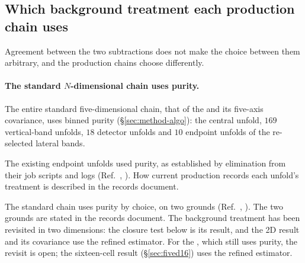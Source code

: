 \subsection{Which background treatment each production chain uses}
\label{sec:negweight-footing}

Agreement between the two subtractions does not make the choice between them arbitrary, and the production chains choose differently.

\paragraph{The standard \(N\)-dimensional chain uses purity.} The entire standard five-dimensional chain, that of the \resFiveAxis{} and its five-axis covariance, uses binned purity (\S\ref{sec:method-algo}): the central unfold, $169$ vertical-band unfolds, $18$ detector unfolds and $10$ endpoint unfolds of the re-selected lateral bands.

The existing endpoint unfolds used purity, as established by elimination from their job scripts and logs (Ref.~\cite{NoteRecords2026}, ). How current production records each unfold's treatment is described in the records document.

The standard chain uses purity by choice, on two grounds (Ref.~\cite{NoteRecords2026}, ). The two grounds are stated in the records document. The background treatment has been revisited in two dimensions: the closure test below is its result, and the 2D result and its covariance use the refined estimator. For the \resFiveAxis{}, which still uses purity, the revisit is open; the sixteen-cell result (\S\ref{sec:fived16}) uses the refined estimator.

